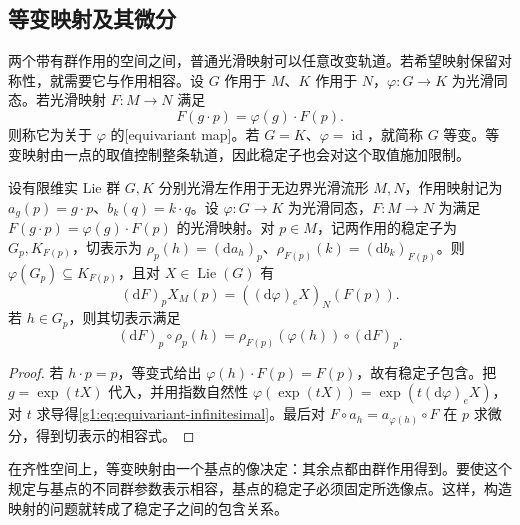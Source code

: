 \subsection{等变映射及其微分}
\label{g1:subsec:1701:04}

两个带有群作用的空间之间，普通光滑映射可以任意改变轨道。若希望映射保留对称性，就需要它与作用相容。设 \(G\) 作用于 \(M\)、\(K\) 作用于 \(N\)，\(\varphi:G\to K\) 为光滑同态。若光滑映射 \(F:M\to N\) 满足
\[
	F(g\cdot p)=\varphi(g)\cdot F(p).
\]
则称它为关于 \(\varphi\) 的[equivariant map]。若 \(G=K\)、\(\varphi=\operatorname{id}\)，就简称 \(G\) 等变。等变映射由一点的取值控制整条轨道，因此稳定子也会对这个取值施加限制。

\begin{proposition}\label{g1:prop:equivariant-map-differential}
	设有限维实 Lie 群 \(G,K\) 分别光滑左作用于无边界光滑流形 \(M,N\)，作用映射记为 \(a_g(p)=g\cdot p\)、\(b_k(q)=k\cdot q\)。设 \(\varphi:G\to K\) 为光滑同态，\(F:M\to N\) 为满足 \(F(g\cdot p)=\varphi(g)\cdot F(p)\) 的光滑映射。对 \(p\in M\)，记两作用的稳定子为 \(G_p,K_{F(p)}\)，切表示为 \(\rho_p(h)=(\mathrm{d}a_h)_p\)、\(\rho_{F(p)}(k)=(\mathrm{d}b_k)_{F(p)}\)。则 \(\varphi(G_p)\subseteq K_{F(p)}\)，且对 \(X\in\operatorname{Lie}(G)\) 有
	\begin{equation}\label{g1:eq:equivariant-infinitesimal}
		(\mathrm{d}F)_pX_M(p)=((\mathrm{d}\varphi)_eX)_N(F(p)).
	\end{equation}
	若 \(h\in G_p\)，则其切表示满足
	\[
		(\mathrm{d}F)_p\circ\rho_p(h)
		=\rho_{F(p)}(\varphi(h))\circ(\mathrm{d}F)_p.
	\]
\end{proposition}
\begin{proof}
	若 \(h\cdot p=p\)，等变式给出 \(\varphi(h)\cdot F(p)=F(p)\)，故有稳定子包含。把 \(g=\exp(tX)\) 代入，并用指数自然性 \(\varphi(\exp(tX))=\exp(t(\mathrm{d}\varphi)_eX)\)，对 \(t\) 求导得\eqref{g1:eq:equivariant-infinitesimal}。最后对 \(F\circ a_h=a_{\varphi(h)}\circ F\) 在 \(p\) 求微分，得到切表示的相容式。
\end{proof}

在齐性空间上，等变映射由一个基点的像决定：其余点都由群作用得到。要使这个规定与基点的不同群参数表示相容，基点的稳定子必须固定所选像点。这样，构造映射的问题就转成了稳定子之间的包含关系。

